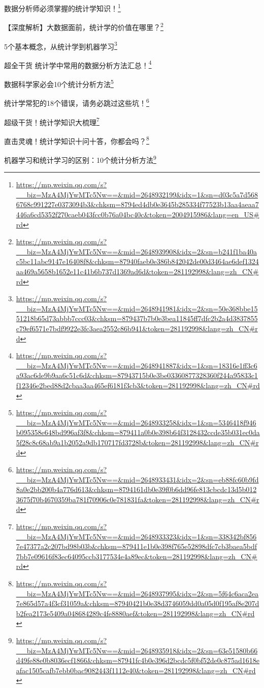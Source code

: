 \documentclass[]{ctexbook}
\renewcommand{\href}[2]{#2\footnote{\url{#1}}}
\begin{document}
\href{https://mp.weixin.qq.com/s?__biz=MzA4MjYwMTc5Nw==\&mid=2648932199\&idx=1\&sn=d03c5a7d5686768c991227e0373094b3\&chksm=8794ed4db0e3645b285334f77523b13aa4aeaa7446a6cd5352f270caeb043fcc0b76a04bc40c\&token=2004915986\&lang=en_US\#rd}{数据分析师必须掌握的统计学知识！}

\href{https://mp.weixin.qq.com/s?__biz=MzA4MjYwMTc5Nw==\&mid=2648939908\&idx=2\&sn=b241f1ba40ac5bc11abc9147e16408f8\&chksm=87940faeb0e386b842042de00d3464ae6def1324aa469a5658b1652e11c41b6b737d1369ad6d\&token=281192998\&lang=zh_CN\#rd}{【深度解析】大数据面前，统计学的价值在哪里？}

\href{https://mp.weixin.qq.com/s?__biz=MzA4MjYwMTc5Nw==\&mid=2648941981\&idx=2\&sn=50e368bbe1551218b65d73abbb7ccc03\&chksm=879437b7b0e3bea11845ff7dfc2b2a4d3837855c79ef6571e7bdf9922e3fc3aea2552c86b941\&token=281192998\&lang=zh_CN\#rd}{5个基本概念，从统计学到机器学习}

\href{https://mp.weixin.qq.com/s?__biz=MzA4MjYwMTc5Nw==\&mid=2648941887\&idx=1\&sn=18316e1ff3c6a93ac6de9b9aa6c51c6d\&chksm=87943715b0e3be03360877328360f244a95833c1f12346e2bed88d2cbaa3aa465ef6181f3cb3\&token=281192998\&lang=zh_CN\#rd}{超全干货 \textbar{} 统计学中常用的数据分析方法汇总！}

\href{https://mp.weixin.qq.com/s?__biz=MzA4MjYwMTc5Nw==\&mid=2648933258\&idx=1\&sn=5346418f946b095358e648bd996af3f8\&chksm=879411a0b0e398b64f3128432ccde35b031ec0da5f28c8c68ab9a1b2052a9db170717fd3728b\&token=281192998\&lang=zh_CN\#rd}{数据科学家必会10个统计分析方法}

\href{https://mp.weixin.qq.com/s?__biz=MzA4MjYwMTc5Nw==\&mid=2648933431\&idx=2\&sn=eb88fc60b9fd8a0e2bb200b4a776d613\&chksm=8794161db0e39f0b6dd96fe813cbcdc13d5b0123675f70b4670359ba781f70906c0e781831fa\&token=281192998\&lang=zh_CN\#rd}{统计学常犯的18个错误，请务必跳过这些坑！}

\href{https://mp.weixin.qq.com/s?__biz=MzA4MjYwMTc5Nw==\&mid=2648933323\&idx=1\&sn=338342bf8567e47377a2c207bd98b03b\&chksm=879411e1b0e398f765e52898dfc7cb3baea5bdf7bb7e09616f83ec64095ccb3177534e4a89ec\&token=281192998\&lang=zh_CN\#rd}{超级干货！统计学知识大梳理}

\href{https://mp.weixin.qq.com/s?__biz=MzA4MjYwMTc5Nw==\&mid=2648937995\&idx=2\&sn=5f64c6aca2ea7e865d57a4f3cf31059a\&chksm=87940421b0e38d3746059dd0a05d0f195af8e207db2fea2173e5409a048684289c4fe8880aef\&token=281192998\&lang=zh_CN\#rd}{直击灵魂！统计学知识十问十答，你都会吗？}

\href{https://mp.weixin.qq.com/s?__biz=MzA4MjYwMTc5Nw==\&mid=2648935918\&idx=2\&sn=63e51580b66d49fe88e0b8036ecf1866\&chksm=87941fc4b0e396d2bcdc5f0bf52de0c875ad1618eafac1505cafb7ebb0bac9082443f1112e40\&token=281192998\&lang=zh_CN\#rd}{机器学习和统计学习的区别：10个统计分析方法}
\end{document}
